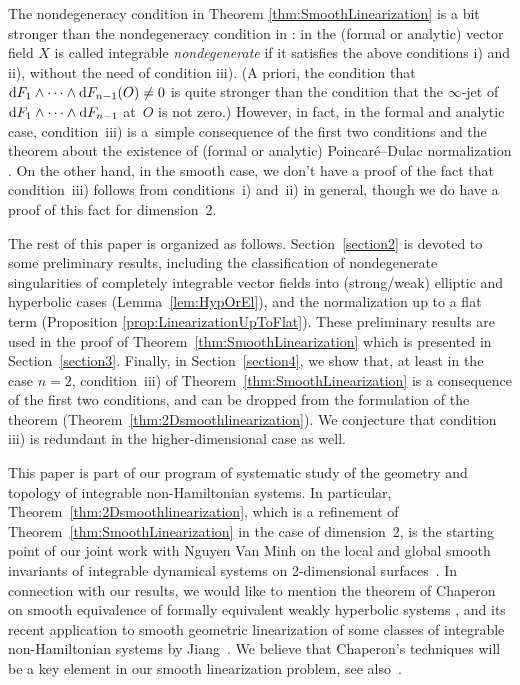 \documentclass[pdftex]{sigma}
\numberwithin{equation}{section}
\begin{document}
The nondegeneracy condition in Theorem \ref{thm:SmoothLinearization} is a bit stronger than the nondegeneracy
condition in \cite{Zung-Nondegenerate2015}: in \cite{Zung-Nondegenerate2015} the (formal or analytic)
vector f\/ield $X$ is called integrable \emph{nondegenerate} if it satisf\/ies the above conditions i) and ii), without the
need of condition iii). (A priori, the condition that ${\rm d}F_1 \wedge \dots \wedge {\rm d}F_{n-1}(O) \neq 0$ is quite stronger than the condition that the $\infty$-jet of ${\rm d}F_1 \wedge \dots \wedge {\rm d}F_{n-1}$ at~$O$ is not zero.) However, in fact, in the formal and analytic case, condition~iii) is a~simple consequence of the f\/irst two conditions and the theorem about the existence of (formal or analytic) Poincar\'e--Dulac normalization
\cite{Zung-Poincare2002,Zung-Nondegenerate2015}. On the other hand, in the smooth case,
we don't have a proof of the fact that condition~iii) follows
from conditions~i) and~ii) in general, though we do have a proof of this fact for dimension~2.

The rest of this paper is organized as follows. Section~\ref{section2} is devoted to some preliminary
results, including the classif\/ication
of nondegenerate singularities of completely integrable vector f\/ields into (strong/weak)
elliptic and hyperbolic cases (Lemma~\ref{lem:HypOrEl}), and
the normalization up to a f\/lat term (Proposition \ref{prop:LinearizationUpToFlat}). These preliminary results
are used in the proof of Theo\-rem~\ref{thm:SmoothLinearization} which is presented in Section~\ref{section3}.
Finally, in Section~\ref{section4}, we show that, at least in the case $n=2$, condition~iii) of
Theorem~\ref{thm:SmoothLinearization} is a consequence of the f\/irst two conditions, and can be dropped
from the formulation of the theorem (Theorem~\ref{thm:2Dsmoothlinearization}). We conjecture that
condition iii) is redundant in the higher-dimensional case as well.

This paper is part of our program of systematic study of the geometry and topology
of integrable non-Hamiltonian systems. In particular, Theorem~\ref{thm:2Dsmoothlinearization},
which is a ref\/inement of Theo\-rem~\ref{thm:SmoothLinearization} in the case of dimension~2,
is the starting point of our joint work with Nguyen Van Minh on the
local and global smooth invariants of integrable dynamical
systems on 2-dimensional surfaces~\cite{ZungMinh_2D2012}. In connection
with our results, we would
like to mention the theorem of Cha\-pe\-ron on smooth equivalence of formally equivalent weakly
hyperbolic systems \cite{Chaperon-WeakHyperbolic2013}, and its recent application to smooth
geometric linearization of some classes of integrable non-Hamiltonian
systems by Jiang~\cite{Jiang-WeakHyp2016}. We believe that Chaperon's techniques will be
a key element in our smooth linearization problem, see also~\cite{Zung-Integrable2016}.
\end{document}
